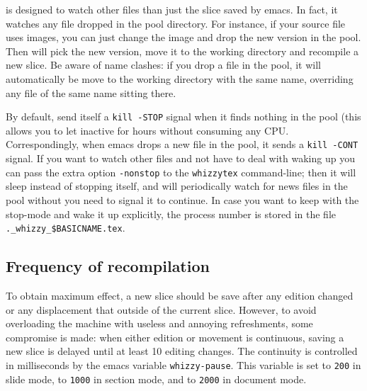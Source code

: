 \documentclass{article}
\let \lst \verb
\let \whizzy \WhizzyTeX
\begin{document}
{\whizzy} is designed to watch other files than just the slice saved by
emacs. In fact, it watches any file dropped in the pool directory. 
For instance, 
if your source file uses images, you can just change the image and
drop the new version in the pool. Then {\whizzy} will pick the new version,
move it to the working directory and recompile a new slice. Be aware of name
clashes: if you drop a file in the pool, it will automatically be move to
the working directory with the same name, overriding any file of the same
name sitting there. 

By default, {\whizzy} send itself a \lst"kill -STOP" signal when it finds
nothing in the pool (this allows you to let {\whizzy} inactive for hours
without consuming any CPU. Correspondingly, when emacs drops a new file in
the pool, it sends a \lst"kill -CONT" signal. If you want to watch other
files and not have to deal with waking up {\whizzy} you can pass the extra
option \lst"-nonstop" to the \lst"whizzytex" command-line; then it will sleep
instead of stopping itself, and will periodically watch for news files 
in the pool without you need to signal it to continue. 
In case you want to keep with the stop-mode and wake it up explicitly, the
process number is stored in the file \lst"._whizzy_$BASICNAME.tex".


\subsection {Frequency of recompilation} 

To obtain maximum {\whizzy} effect, a new slice should be save after any
edition changed or any displacement that outside of the current slice.
However, to avoid overloading the machine with useless and annoying
refreshments, some compromise is made: when either edition or movement
is continuous, saving a new slice is delayed until at least 10 editing
changes. The continuity is controlled in milliseconds by the emacs variable
\lst"whizzy-pause". This variable is set to \lst"200" in slide
mode, to \lst"1000" in section mode, and to \lst"2000" in document mode.
\end{document}

